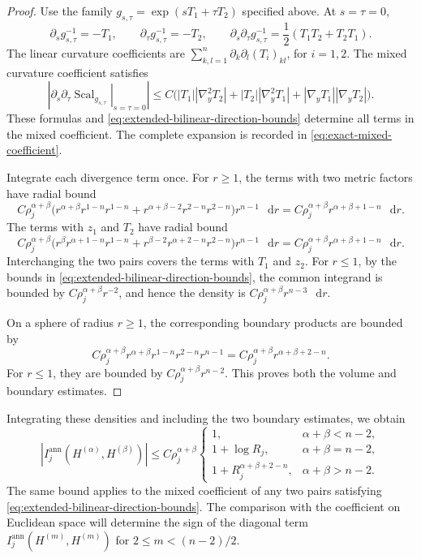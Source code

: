 \documentclass[11pt]{article}
\numberwithin{equation}{section}
\theoremstyle{remark}
\newcommand{\dd}{\mathop{}\!\mathrm{d}}
\begin{document}
\begin{proof}
Use the family \(g_{s,\tau}=\exp(sT_1+\tau T_2)\) specified above.
At \(s=\tau=0\),
\[
 \partial_sg_{s,\tau}^{-1}=-T_1,\qquad
 \partial_\tau g_{s,\tau}^{-1}=-T_2,\qquad
 \partial_s\partial_\tau g_{s,\tau}^{-1}
 =\frac12(T_1T_2+T_2T_1).
\]
The linear curvature coefficients are
\(\sum_{k,l=1}^n\partial_k\partial_l(T_i)_{kl}\), for \(i=1,2\).
The mixed curvature coefficient satisfies
\[
 \left|\left.\partial_s\partial_\tau \operatorname{Scal}_{g_{s,\tau}}
 \right|_{s=\tau=0}\right|
 \le C\bigl(
 |T_1||\nabla_y^2T_2|+|T_2||\nabla_y^2T_1|
 +|\nabla_yT_1||\nabla_yT_2|\bigr).
\]
These formulas and \eqref{eq:extended-bilinear-direction-bounds}
determine all terms in the mixed coefficient.
{The complete expansion is recorded in
\eqref{eq:exact-mixed-coefficient}.}

Integrate each divergence term once. For \(r\ge1\), the terms with two
metric factors have radial bound
\[
 C\rho_j^{\alpha+\beta}
 \bigl(r^{\alpha+\beta}r^{1-n}r^{1-n}
 +r^{\alpha+\beta-2}r^{2-n}r^{2-n}\bigr)r^{n-1}\,\dd r
 =C\rho_j^{\alpha+\beta}r^{\alpha+\beta+1-n}\,\dd r.
\]
The terms with \(z_1\) and \(T_2\) have radial bound
\[
 C\rho_j^{\alpha+\beta}
 \bigl(r^\beta r^{\alpha+1-n}r^{1-n}
 +r^{\beta-2}r^{\alpha+2-n}r^{2-n}\bigr)r^{n-1}\,\dd r
 =C\rho_j^{\alpha+\beta}r^{\alpha+\beta+1-n}\,\dd r.
\]
Interchanging the two pairs covers the terms with \(T_1\) and \(z_2\).
{For \(r\le1\), by the bounds in
\eqref{eq:extended-bilinear-direction-bounds}, the common integrand is
bounded by \(C\rho_j^{\alpha+\beta}r^{-2}\), and hence the density is}
\(C\rho_j^{\alpha+\beta}r^{n-3}\,\dd r\).

On a sphere of radius \(r\ge1\), the corresponding boundary products
are bounded by
\[
 C\rho_j^{\alpha+\beta}
 r^{\alpha+\beta}r^{1-n}r^{2-n}r^{n-1}
 =C\rho_j^{\alpha+\beta}r^{\alpha+\beta+2-n}.
\]
For \(r\le1\), they are bounded by
\(C\rho_j^{\alpha+\beta}r^{n-2}\).
This proves both the volume and boundary estimates.
\end{proof}

{Integrating these densities and including the two boundary
estimates, we obtain}
\begin{equation}\label{eq:integrated-bilinear-density}
 |I_j^{\mathrm{ann}}(H^{(\alpha)},H^{(\beta)})|
 \le C\rho_j^{\alpha+\beta}
 \begin{cases}
  1,&\alpha+\beta<n-2,\\
  1+\log R_j,&\alpha+\beta=n-2,\\
  1+R_j^{\alpha+\beta+2-n},&\alpha+\beta>n-2.
 \end{cases}
\end{equation}
The same bound applies to the mixed coefficient of any two pairs
satisfying \eqref{eq:extended-bilinear-direction-bounds}.
The comparison with the coefficient on Euclidean space will determine
the sign of the diagonal term \(I_j^{\mathrm{ann}}(H^{(m)},H^{(m)})\) for \(2\le m<(n-2)/2\).
\end{document}
